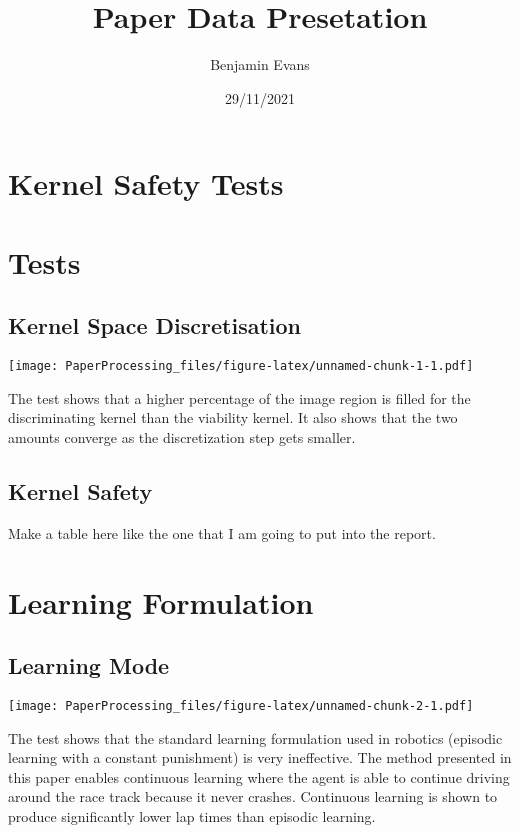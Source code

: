 \documentclass[
]{article}
\title{Paper Data Presetation}
\author{Benjamin Evans}
\date{29/11/2021}
\begin{document}
\maketitle

\hypertarget{kernel-safety-tests}{%
\section{Kernel Safety Tests}\label{kernel-safety-tests}}

\hypertarget{tests}{%
\section{Tests}\label{tests}}

\hypertarget{kernel-space-discretisation}{%
\subsection{Kernel Space
Discretisation}\label{kernel-space-discretisation}}

\texttt{[image: PaperProcessing\_files/figure-latex/unnamed-chunk-1-1.pdf]}

The test shows that a higher percentage of the image region is filled
for the discriminating kernel than the viability kernel. It also shows
that the two amounts converge as the discretization step gets smaller.

\hypertarget{kernel-safety}{%
\subsection{Kernel Safety}\label{kernel-safety}}

Make a table here like the one that I am going to put into the report.

\hypertarget{learning-formulation}{%
\section{Learning Formulation}\label{learning-formulation}}

\hypertarget{learning-mode}{%
\subsection{Learning Mode}\label{learning-mode}}

\texttt{[image: PaperProcessing\_files/figure-latex/unnamed-chunk-2-1.pdf]}

The test shows that the standard learning formulation used in robotics
(episodic learning with a constant punishment) is very ineffective. The
method presented in this paper enables continuous learning where the
agent is able to continue driving around the race track because it never
crashes. Continuous learning is shown to produce significantly lower lap
times than episodic learning.
\end{document}
